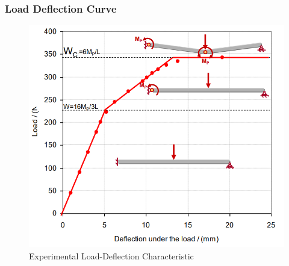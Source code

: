 \documentclass[class=report, crop=false, 12pt,a4paper]{standalone}
\begin{document}
\subsubsection{\large Load Deflection Curve}
\begin{figure}[H]
  \centering
  \includegraphics[width = 0.8 \textwidth]{../img/graph8.PNG}
  \caption{Experimental Load-Deflection Characteristic}
\end{figure}
\end{document}
